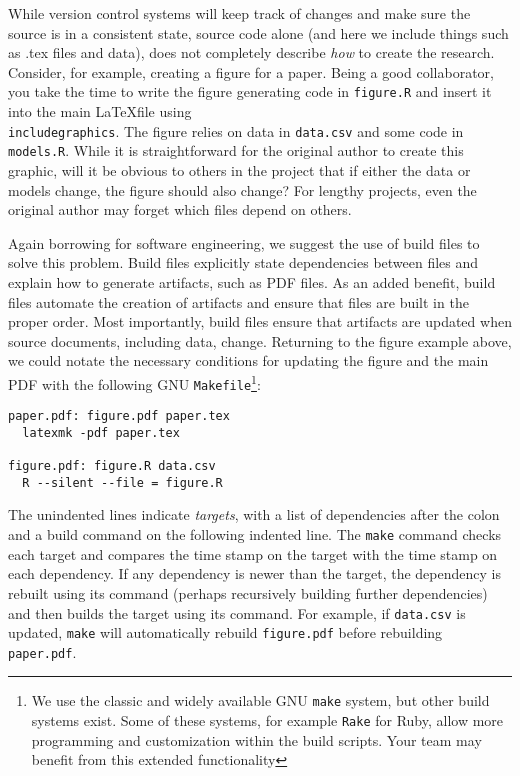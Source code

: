 \documentclass[]{article}
\begin{document}


While version control systems will keep track of changes and make sure the
source is in a consistent state,  %
source code alone (and here we include things such as .tex files and data),
does not completely describe \emph{how} to create the research. Consider, for
example, creating a figure for a paper. Being a good collaborator, you take
the time to write the figure generating code in \texttt{figure.R} and insert
it into the main \LaTeX file using
\texttt{\\includegraphics}. The figure relies on data in \texttt{data.csv} and
some code in \texttt{models.R}. While it is straightforward for the original
author to create this graphic, will it be obvious to others in the project
that if either the data or models change, the figure should also change? For
lengthy projects, even the original author may forget which files depend on
others.

Again borrowing for software engineering, we suggest the use of build files to
solve this problem. Build files explicitly state dependencies between files
and explain how to generate artifacts, such as PDF files. As an added benefit,
build files automate the creation of artifacts and ensure that files are built
in the proper order. Most importantly, build files ensure that artifacts are
updated when source documents, including data, change. Returning to the figure
example above, we could notate the necessary conditions for updating the
figure and the main PDF with the following GNU \texttt{Makefile}\footnote{We
use the classic and widely available GNU \texttt{make} system, but other build
systems exist. Some of these systems, for example \texttt{Rake} for Ruby,
allow more programming and customization within the build scripts. Your team
may benefit from this extended functionality}:

\begin{verbatim}
paper.pdf: figure.pdf paper.tex
  latexmk -pdf paper.tex

figure.pdf: figure.R data.csv
  R --silent --file = figure.R
\end{verbatim}

The unindented lines indicate \emph{targets}, with a list of dependencies
after the colon and a build command on the following indented line.
The \texttt{make} command checks each target and compares the
time stamp on the target with the time stamp on each dependency. If any
dependency is newer than the target, the dependency is rebuilt using its
command (perhaps recursively building further dependencies) and then builds
the target using its command. For example, if \texttt{data.csv} is updated,
\texttt{make} will automatically rebuild \texttt{figure.pdf} before rebuilding
\texttt{paper.pdf}.
\end{document}
